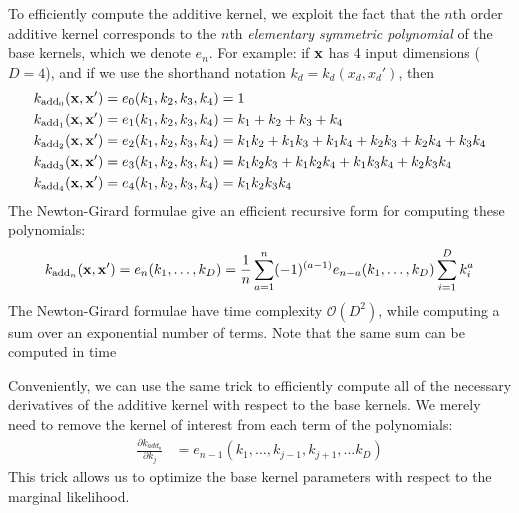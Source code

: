 To efficiently compute the additive kernel, we exploit the fact that the $n$th order additive kernel corresponds to the $n$th \textit{elementary symmetric polynomial} \citep{macdonald1998symmetric}
of the base kernels, which we denote $e_n$.
For example:  if ${\bf{x}}$ has 4 input dimensions ($D = 4$), and if we use the shorthand notation $k_d = k_d(x_d, x_d')$, then
%
\begin{align}
k_{\textnormal{add}_0}({\bf x, x'}) & = e_0( k_1, k_2, k_3, k_4 ) = 1 \\
k_{\textnormal{add}_1}({\bf x, x'}) & = e_1( k_1, k_2, k_3, k_4 ) = k_1 + k_2 + k_3 + k_4 \\
k_{\textnormal{add}_2}({\bf x, x'}) & = e_2( k_1, k_2, k_3, k_4 ) = k_1 k_2 + k_1 k_3 + k_1k_4 + k_2 k_3 + k_2 k_4 + k_3 k_4 \\
k_{\textnormal{add}_3}({\bf x, x'}) & = e_3( k_1, k_2, k_3, k_4 ) = k_1 k_2 k_3 + k_1 k_2 k_4 + k_1 k_3 k_4 + k_2 k_3 k_4 \\
k_{\textnormal{add}_4}({\bf x, x'}) & = e_4( k_1, k_2, k_3, k_4 ) = k_1 k_2 k_3 k_4
\end{align}
%
The Newton-Girard formulae give an efficient recursive form for computing these polynomials:
%
\begin{align}
k_{\textnormal{add}_n}({\bf x, x'}) = e_n(k_1,\dots,k_D) = \frac{1}{n} \sum_{a=1}^n (-1)^{(a-1)} e_{n-a}(k_1,\dots,k_D)  \sum_{i=1}^Dk_i^a
\end{align}
%
The Newton-Girard formulae have time complexity $\mathcal{O}( D^2 )$, while computing a sum over an exponential number of terms.
Note that the same sum can be computed in time 

Conveniently, we can use the same trick to efficiently compute all of the necessary derivatives of the additive kernel with respect to the base kernels.
We merely need to remove the kernel of interest from each term of the polynomials:
%
\begin{align}
\frac{\partial k_{add_n}}{\partial k_j} & = e_{n-1}(k_1,\dots,k_{j-1},k_{j+1}, \dots k_D)
\end{align}
%
This trick allows us to optimize the base kernel parameters with respect to the marginal likelihood.

